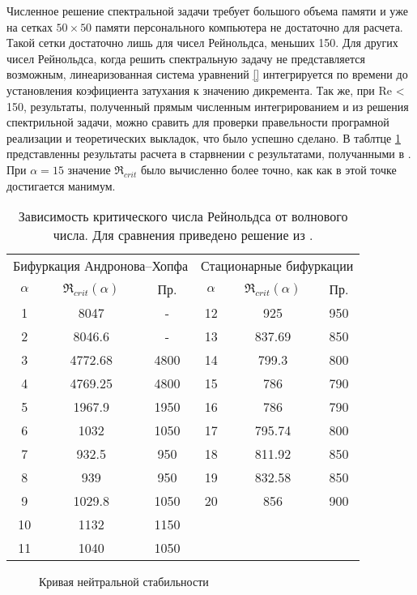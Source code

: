 Численное решение спектральной задачи требует большого объема памяти и уже на сетках $50 \times 50$ памяти персонального компьютера не достаточно для расчета. Такой сетки достаточно лишь для чисел Рейнольдса, меньших 150. Для других чисел Рейнольдса, когда решить спектральную задачу не представляется возможным, линеаризованная система уравнений \ref{} интегрируется по времени до установления коэфициента затухания к значению дикремента. Так же, при Re < 150, результаты, полученный прямым численным интегрированием и из решения спектрильной задачи, можно сравить для проверки правельности програмной реализации и теоретических выкладок, что было успешно сделано. 
В таблтце \ref{Re_al} представленны результаты расчета в старвнении с результатами, получанными в \cite{lin-stability}. При $\alpha = 15$ значение $\Re_{crit}$ было вычисленно более точно, как как в этой точке достигается манимум.

\begin{table}
 \begin{tabular}{cccccc}
\hline
\hline
  \multicolumn{3}{c}{Бифуркация Андронова--Хопфа} & \multicolumn{3}{c}{Стационарные бифуркации} \\
  $\alpha$&	$\Re_{crit}(\alpha)$ \cite{lin-stability}&  Пр.&	$\alpha$&	$\Re_{crit}(\alpha)$ \cite{lin-stability}&  Пр. \\
\hline
  1&	8047&		-&	12&	925&		950\\ 
  2&	8046.6&		-&	13&	837.69&		850\\
  3&	4772.68&	4800&	14&	799.3&		800\\
  4&	4769.25&	4800&	15&	786&		790\\
  5&	1967.9&		1950&	16&	786&		790\\
  6&	1032&		1050&	17&	795.74&		800\\
  7&	932.5&		950&	18&	811.92&		850\\
  8&	939&		950&	19&	832.58&		850\\
  9&	1029.8&		1050&	20&	856&		900\\
  10&	1132&		1150\\
  11&	1040&		1050\\
\hline
 \end{tabular}
 \caption{Зависимость критического числа Рейнольдса от волнового числа. Для сравнения приведено решение из \cite{lin-stability}. }
 \label{Re_al}
\end{table}

\begin{figure}
  \center
  
  \caption{Кривая нейтральной стабильности}
  \label{graph:Re_al}
\end{figure}


